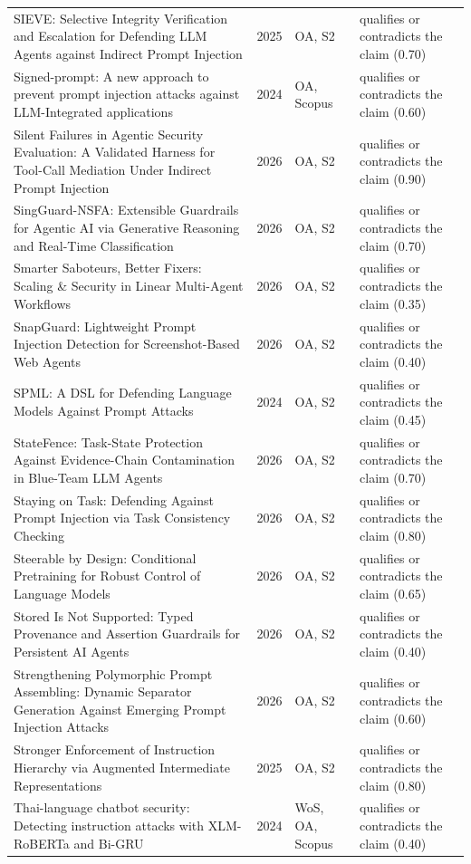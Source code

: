 \begin{longtable}{@{}%
  >{\raggedright\arraybackslash}p{}c%
  >{\raggedright\arraybackslash}p{}%
  >{\raggedright\arraybackslash}p{}@{}}
SIEVE: Selective Integrity Verification and Escalation for Defending LLM Agents against Indirect Prompt Injection & 2025 & OA, S2 & qualifies or contradicts the claim (0.70) \\
Signed-prompt: A new approach to prevent prompt injection attacks against LLM-Integrated applications & 2024 & OA, Scopus & qualifies or contradicts the claim (0.60) \\
Silent Failures in Agentic Security Evaluation: A Validated Harness for Tool-Call Mediation Under Indirect Prompt Injection & 2026 & OA, S2 & qualifies or contradicts the claim (0.90) \\
SingGuard-NSFA: Extensible Guardrails for Agentic AI via Generative Reasoning and Real-Time Classification & 2026 & OA, S2 & qualifies or contradicts the claim (0.70) \\
Smarter Saboteurs, Better Fixers: Scaling \& Security in Linear Multi-Agent Workflows & 2026 & OA, S2 & qualifies or contradicts the claim (0.35) \\
SnapGuard: Lightweight Prompt Injection Detection for Screenshot-Based Web Agents & 2026 & OA, S2 & qualifies or contradicts the claim (0.40) \\
SPML: A DSL for Defending Language Models Against Prompt Attacks & 2024 & OA, S2 & qualifies or contradicts the claim (0.45) \\
StateFence: Task-State Protection Against Evidence-Chain Contamination in Blue-Team LLM Agents & 2026 & OA, S2 & qualifies or contradicts the claim (0.70) \\
Staying on Task: Defending Against Prompt Injection via Task Consistency Checking & 2026 & OA, S2 & qualifies or contradicts the claim (0.80) \\
Steerable by Design: Conditional Pretraining for Robust Control of Language Models & 2026 & OA, S2 & qualifies or contradicts the claim (0.65) \\
Stored Is Not Supported: Typed Provenance and Assertion Guardrails for Persistent AI Agents & 2026 & OA, S2 & qualifies or contradicts the claim (0.40) \\
Strengthening Polymorphic Prompt Assembling: Dynamic Separator Generation Against Emerging Prompt Injection Attacks & 2026 & OA, S2 & qualifies or contradicts the claim (0.60) \\
Stronger Enforcement of Instruction Hierarchy via Augmented Intermediate Representations & 2025 & OA, S2 & qualifies or contradicts the claim (0.80) \\
Thai-language chatbot security: Detecting instruction attacks with XLM-RoBERTa and Bi-GRU & 2024 & WoS, OA, Scopus & qualifies or contradicts the claim (0.40) \\

\end{longtable}
